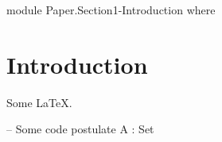 \begin{code}[hide]
module Paper.Section1-Introduction where
\end{code}

\section{Introduction}

\begin{frame}
Some \LaTeX.

\begin{code}
-- Some code
postulate A : Set
\end{code}
\end{frame}
